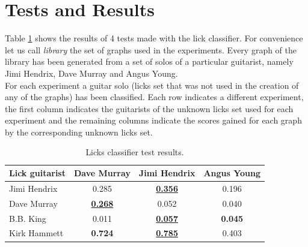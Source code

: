 \documentclass{llncs}
\begin{document}
\section{Tests and Results}
Table \ref{tab:classifier} shows the results of 4 tests
made with the lick classifier. For convenience let us call
\emph{library} the set of graphs used in the experiments. Every graph of
the library has been generated from a set of solos of a particular
guitarist, namely Jimi Hendrix, Dave Murray and Angus Young.\\
For each experiment a guitar solo (licks set that was not used in
the creation of any of the graphs) has been classified. 
Each row indicates a different
experiment, the first column indicates the guitarists of the unknown
licks set used
for each experiment and the remaining columns indicate the scores gained
for each graph by the corresponding unknown licks set. \setlength{\tabcolsep}{8pt}
\begin{table}
\begin{center}
  \begin{tabular}{ l c c c }
    \hline
    Lick guitarist  & Dave Murray & Jimi Hendrix & Angus Young  \\ \hline
	Jimi Hendrix & 0.285 & \underline{\textbf{0.356}} & 0.196 \\
    Dave Murray & \underline{\textbf{0.268}} & 0.052 & 0.040 \\
	B.B. King & 0.011 & \underline{\textbf{0.057}} & \textbf{0.045} \\
	Kirk Hammett & \textbf{0.724} & \underline{\textbf{0.785}} & 0.403 \\
  \end{tabular}
\end{center}
\caption{Licks classifier test results.}
\label{tab:classifier}
\end{table}
\end{document}
